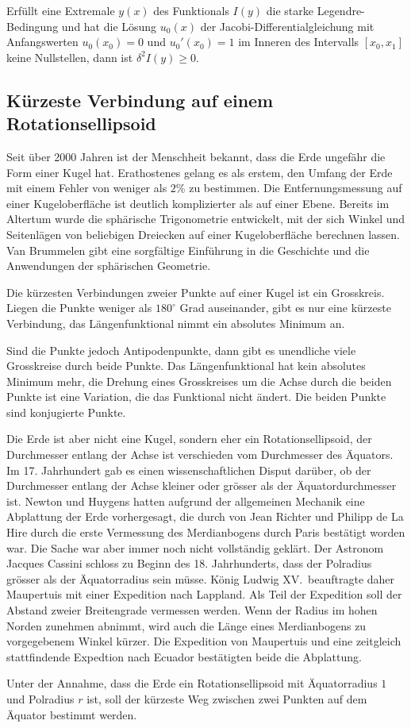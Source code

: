 \begin{satz}
Erfüllt eine Extremale $y(x)$ des Funktionals $I(y)$ die starke
Legendre-Bedingung und hat die Lösung $u_0(x)$ der Jacobi-Differentialgleichung
mit Anfangswerten $u_0(x_0)=0$ und $u_0'(x_0)=1$ im Inneren des
Intervalls $[x_0,x_1]$ keine Nullstellen, dann ist
$\delta^2 I(y)\ge 0$.
\end{satz}




%
%
\subsection{Kürzeste Verbindung auf einem Rotationsellipsoid}
Seit über 2000 Jahren ist der Menschheit bekannt, dass die Erde
ungefähr die Form einer Kugel hat.
Erathostenes gelang es als erstem, den Umfang der Erde mit
einem Fehler von weniger als $2\%$ zu bestimmen.
Die Entfernungsmessung auf einer Kugeloberfläche ist deutlich
komplizierter als auf einer Ebene.
Bereits im Altertum wurde die sphärische Trigonometrie entwickelt,
mit der sich Winkel und Seitenlägen von beliebigen Dreiecken auf
einer Kugeloberfläche berechnen lassen.
Van Brummelen \cite{buch:heavenly} gibt eine sorgfältige Einführung
in die Geschichte und die Anwendungen der sphärischen Geometrie.

\begin{beispiel}
Die kürzesten Verbindungen zweier Punkte auf einer Kugel ist ein
Grosskreis.
Liegen die Punkte weniger als $180^\circ$ Grad auseinander, gibt es
nur eine kürzeste Verbindung, das Längenfunktional nimmt ein
absolutes Minimum an.

Sind die Punkte jedoch Antipodenpunkte, dann gibt es unendliche viele
Grosskreise durch beide Punkte.
Das Längenfunktional hat kein absolutes Minimum mehr, die Drehung eines
Grosskreises um die Achse durch die beiden Punkte ist eine Variation,
die das Funktional nicht ändert.
Die beiden Punkte sind konjugierte Punkte.
\end{beispiel}

Die Erde ist aber nicht eine Kugel, sondern eher ein Rotationsellipsoid,
der Durchmesser entlang der Achse ist verschieden vom Durchmesser des 
Äquators.
Im 17. Jahrhundert gab es einen wissenschaftlichen Disput darüber,
ob der Durchmesser entlang der Achse kleiner oder grösser als der
Äquatordurchmesser ist.
Newton und Huygens hatten aufgrund der allgemeinen Mechanik eine Abplattung
der Erde vorhergesagt, die durch von Jean Richter und Philipp de La Hire
durch die erste Vermessung des Merdianbogens durch Paris bestätigt 
worden war.
Die Sache war aber immer noch nicht vollständig geklärt.
Der Astronom Jacques Cassini schloss zu Beginn des 18. Jahrhunderts,
dass der Polradius grösser als der Äquatorradius sein müsse.
König Ludwig XV.~beauftragte daher Maupertuis mit einer Expedition
nach Lappland.
Als Teil der Expedition soll der Abstand zweier Breitengrade
vermessen werden.
Wenn der Radius im hohen Norden zunehmen abnimmt, wird auch die Länge
eines Merdianbogens zu vorgegebenem Winkel kürzer.
Die Expedition von Maupertuis und eine zeitgleich stattfindende Expedtion
nach Ecuador bestätigten beide die Abplattung.

\begin{beispiel}
Unter der Annahme, dass die Erde ein Rotationsellipsoid mit Äquatorradius
$1$ und Polradius $r$ ist, soll der kürzeste Weg zwischen zwei Punkten
auf dem Äquator bestimmt werden.
\end{beispiel}



